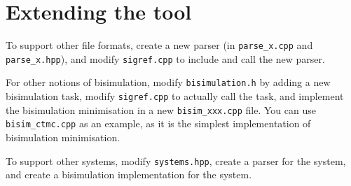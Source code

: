 \section{Extending the tool}

To support other file formats, create a new parser (in \texttt{parse\_x.cpp} and \texttt{parse\_x.hpp}), and modify \texttt{sigref.cpp} to include and call the new parser.

For other notions of bisimulation, modify \texttt{bisimulation.h} by adding a new bisimulation task, modify \texttt{sigref.cpp} to actually call the task, and implement the bisimulation minimisation in a new \texttt{bisim\_xxx.cpp} file.
You can use \texttt{bisim\_ctmc.cpp} as an example, as it is the simplest implementation of bisimulation minimisation.

To support other systems, modify \texttt{systems.hpp}, create a parser for the system, and create a bisimulation implementation for the system.

